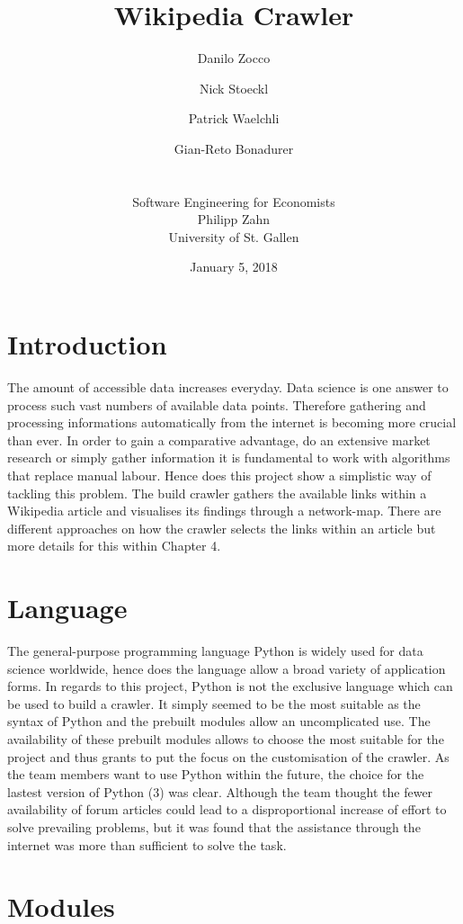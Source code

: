 \documentclass[10pt]{article}
\title{Wikipedia Crawler}
\author{Danilo Zocco\\ 
	\and Nick Stoeckl\\ 	
	\and Patrick Waelchli\\ 
	\and Gian-Reto Bonadurer\\ 
	\\ \\
	\small Software Engineering for Economists\\
	\small Philipp Zahn\\
	\small University of St. Gallen}
\date{January 5, 2018}
\begin{document}
\maketitle
\newpage


\tableofcontents

\newpage

\section{Introduction}

The amount of accessible data increases everyday. Data science is one answer to process such vast numbers of available data points. Therefore gathering and processing informations automatically from 
the internet is becoming more crucial than ever. In order to gain a comparative advantage, do an extensive market research or simply gather information it is fundamental to work with algorithms that replace manual labour. 
Hence does this project show a simplistic way of tackling this problem. The build crawler gathers the available links within a Wikipedia article and visualises its findings through a network-map. 
There are different approaches on how the crawler selects the links within an article but more details for this within Chapter 4.

\section{Language}

The general-purpose programming language Python is widely used for data science worldwide, hence does the language allow a broad variety of application forms. In regards to this project, Python is not the exclusive language which can be used to build a crawler. It simply seemed to be the most suitable as the syntax of Python and the prebuilt modules allow an uncomplicated use. The availability of these prebuilt modules allows to choose the most suitable for the project and thus grants to put the focus on the customisation of the crawler. As the team members want to use Python within the future, the choice for the lastest version of Python (3) was clear. Although the team thought the fewer availability of forum articles could lead to a disproportional increase of effort to solve prevailing problems, but it was found that the assistance through the internet was more than sufficient to solve the task. 


\section{Modules}
\end{document}
